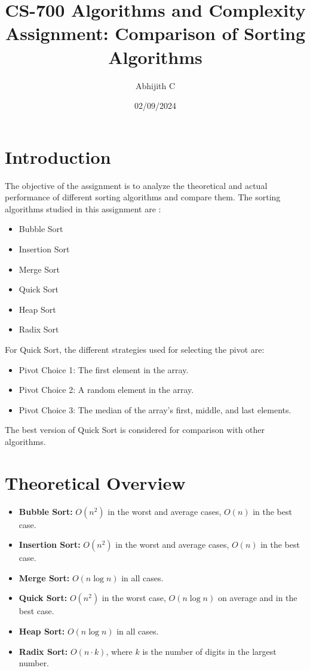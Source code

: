 \documentclass[12pt]{article}
\begin{document}
\title{\textbf{CS-700 Algorithms and Complexity
Assignment: Comparison of Sorting Algorithms}}
\author{Abhijith C}
\date{02/09/2024}

\maketitle

\tableofcontents

\newpage

\section{Introduction}
    The objective of the assignment is to analyze the theoretical and actual performance of different sorting algorithms and compare them. The sorting algorithms studied in this assignment are :
    
    \begin{itemize}
        \item Bubble Sort
        \item Insertion Sort
        \item Merge Sort
        \item Quick Sort
        \item Heap Sort
        \item Radix Sort
    \end{itemize}
    
    For Quick Sort, the different strategies used for selecting the pivot are:
    
    \begin{itemize}
        \item Pivot Choice 1: The first element in the array.
        \item Pivot Choice 2: A random element in the array.
        \item Pivot Choice 3: The median of the array's first, middle, and last elements.
    \end{itemize}
    
    The best version of Quick Sort is considered for comparison with other algorithms.

\section{Theoretical Overview}


\begin{itemize}
    \item \textbf{Bubble Sort:} \(O(n^2)\) in the worst and average cases, \(O(n)\) in the best case.
    \item \textbf{Insertion Sort:} \(O(n^2)\) in the worst and average cases, \(O(n)\) in the best case.
    \item \textbf{Merge Sort:} \(O(n \log n)\) in all cases.
    \item \textbf{Quick Sort:} \(O(n^2)\) in the worst case, \(O(n \log n)\) on average and in the best case.
    \item \textbf{Heap Sort:} \(O(n \log n)\) in all cases.
    \item \textbf{Radix Sort:} \(O(n \cdot k)\), where \(k\) is the number of digits in the largest number.
\end{itemize}
\end{document}

